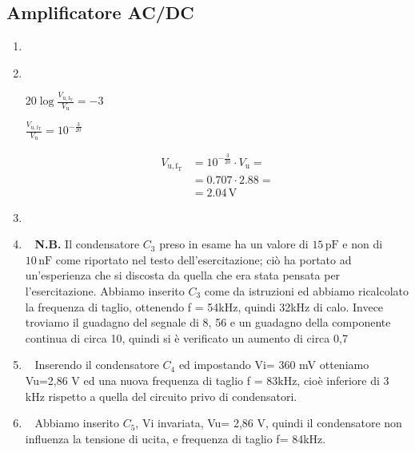 \documentclass[a4paper]{article}
\begin{document}
		\subsection{Amplificatore AC/DC}
			\begin{enumerate}[label=\alph*.]
				\item \ 
					\newline
				\item \ 
					\newline
					\begin{center}
						$ 20 \log \frac{V_{\mathrm{u, f_{T}}}}{V_{\mathrm{u}}} = -3 $
					\end{center}
					\newline
					\begin{center}
						$ \frac{V_{\mathrm{u, f_{T}}}}{V_{\mathrm{u}}} = 10^{-\frac{3}{20}} $
					\end{center}
					\newline
					\begin{equation*}
						\begin{split}
							V_{\mathrm{u, f_{T}}} &= 10^{-\frac{3}{20}} \cdot V_{\mathrm{u}} = \\
												  &= 0.707 \cdot 2.88 = \\
												  &= 2.04 \, \mathrm{V}
						\end{split}
					\end{equation*}
				\item \ 
				\item \ 
					\newline
					\textbf{N.B.} Il condensatore $ C_{3} $ preso in esame ha un valore di $ 15 \, \mathrm{pF} $ e non di $ 10 \, \mathrm{nF} $ come riportato nel testo dell'esercitazione; ciò ha portato ad un'esperienza che si discosta da quella che era stata pensata per l'esercitazione.
					\newline
					\newline
					Abbiamo inserito $ C_{3} $ come da istruzioni ed abbiamo ricalcolato la frequenza di taglio, ottenendo f = 54kHz, quindi 32kHz di calo.
					\newline
					Invece troviamo il guadagno del segnale di 8, 56 e un guadagno della componente continua di circa 10, quindi si è verificato un aumento di circa 0,7
				\item \ 
					\newline
					Inserendo il condensatore $ C_{4} $ ed impostando Vi= 360 mV otteniamo Vu=2,86 V ed una nuova frequenza di taglio f = 83kHz, cioè inferiore di 3 kHz rispetto a quella del circuito privo di condensatori. 
				\item \ 
					\newline
					Abbiamo inserito $ C_{5} $, Vi invariata, Vu= 2,86 V, quindi il condensatore non influenza la tensione di ucita, e frequenza di taglio f= 84kHz.
			\end{enumerate}
\end{document}

